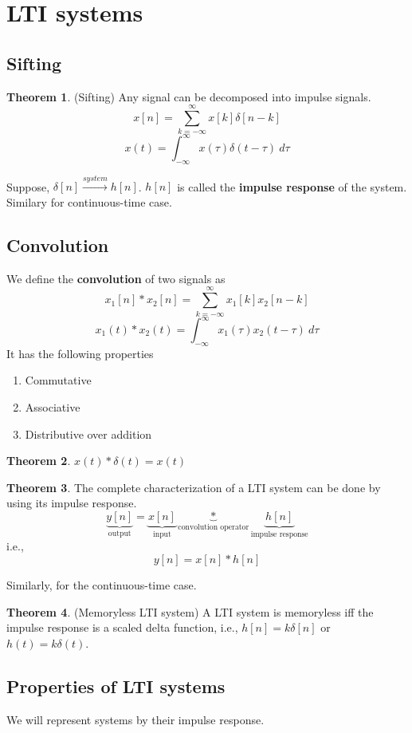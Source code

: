 \documentclass[10pt, a4paper]{extarticle}
\theoremstyle{definition}
\newtheorem*{thm}{Theorem}
\begin{document}
\section{LTI systems}
\subsection{Sifting}
\begin{thm}(Sifting)
	Any signal can be decomposed into impulse signals.
	\[x[n]=\sum_{k=-\infty}^\infty x[k]\delta[n-k]\]
	\[x(t)=\int_{-\infty}^{\infty}x(\tau)\delta(t-\tau)\ d\tau\]
\end{thm}
Suppose, $\delta[n]\xrightarrow{system}h[n]$. $h[n]$ is called the \textbf{impulse response} of the system. Similary for continuous-time case.
\subsection{Convolution}
We define the \textbf{convolution} of two signals as
\[x_1[n]*x_2[n]=\sum_{k=-\infty}^\infty x_1[k]x_2[n-k]\]
\[x_1(t)*x_2(t)=\int_{-\infty}^{\infty}x_1(\tau)x_2(t-\tau)\ d\tau\]
It has the following properties
\begin{enumerate}
	\item Commutative
	\item Associative
	\item Distributive over addition
\end{enumerate}
\begin{thm}
	$x(t)*\delta(t)=x(t)$
\end{thm}
\begin{thm}
	The complete characterization of a LTI system can be done by using its impulse response.
	\[\underbrace{y[n]}_{\text{output}}=\underbrace{x[n]}_{\text{input}}\underbrace{*}_{\text{convolution operator}}\underbrace{h[n]}_{\text{impulse response}}\]
	i.e.,\[y[n]=x[n]*h[n]\]
\end{thm}
Similarly, for the continuous-time case.

\begin{thm}(Memoryless LTI system)
	A LTI system is memoryless iff the impulse response is a scaled delta function, i.e., $h[n]=k\delta[n]$ or $h(t)=k\delta(t)$.
\end{thm}

\subsection{Properties of LTI systems}
We will represent systems by their impulse response.
\end{document}
